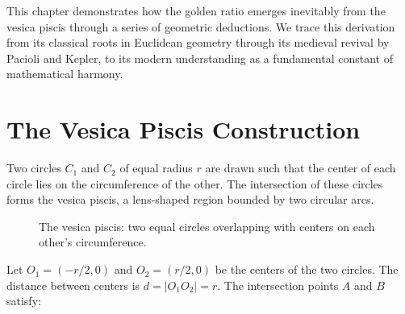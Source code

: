 This chapter demonstrates how the golden ratio emerges inevitably from the vesica piscis through a series of geometric deductions. We trace this derivation from its classical roots in Euclidean geometry through its medieval revival by Pacioli and Kepler, to its modern understanding as a fundamental constant of mathematical harmony.

\section{The Vesica Piscis Construction}

\begin{definition}
Two circles $C_1$ and $C_2$ of equal radius $r$ are drawn such that the center of each circle lies on the circumference of the other. The intersection of these circles forms the vesica piscis, a lens-shaped region bounded by two circular arcs.
\end{definition}

\begin{figure}[H]
\centering
{}
\caption{The vesica piscis: two equal circles overlapping with centers on each other's circumference.}
\label{fa_01:fig:vesica}
\end{figure}

Let $O_1 = (-r/2, 0)$ and $O_2 = (r/2, 0)$ be the centers of the two circles. The distance between centers is $d = |O_1 O_2| = r$. The intersection points $A$ and $B$ satisfy:

